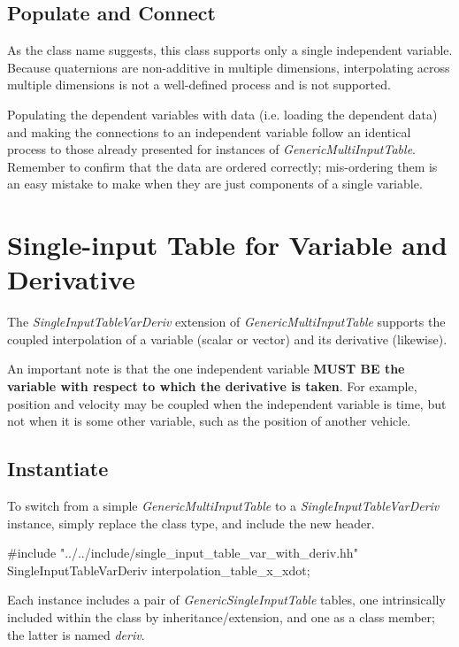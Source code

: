 \documentclass[11pt,fleqn]{report}
\begin{document}
\subsection{Populate and Connect}

As the class name suggests, this class supports only a single independent
variable.  Because quaternions are non-additive in multiple dimensions,
interpolating across multiple dimensions is not a well-defined
process and is not supported.

Populating the dependent variables with data (i.e. loading the dependent
data) and making the connections to an independent
variable follow an identical process to those already
presented for instances of \textit{GenericMultiInputTable}.  Remember to
confirm that the data are ordered correctly; mis-ordering them
is an easy mistake to make when they are just components of a single variable.


\section{Single-input Table for Variable and Derivative}
\label{sec:UG_var_deriv}
The \textit{SingleInputTableVarDeriv} extension of
\textit{GenericMultiInputTable} supports the coupled interpolation of a
variable (scalar or vector) and its derivative (likewise).

An important note is that the one independent variable
\textbf{MUST BE the variable with respect to which the derivative is taken}.
For example, position and velocity may be coupled when the independent variable
is time, but not when it is some other variable, such as the position of
another vehicle.

\subsection{Instantiate}
To switch from a simple \textit{GenericMultiInputTable} to a
\textit{SingleInputTableVarDeriv} instance, simply replace the class
type, and include the new header.
\begin{code}
#include "../../include/single_input_table_var_with_deriv.hh"
SingleInputTableVarDeriv  interpolation_table_x_xdot;
\end{code}
Each instance includes a pair of \textit{GenericSingleInputTable} tables, one
intrinsically included within the class by inheritance/extension, and one as a
class member; the latter is named \textit{deriv}.
\end{document}

